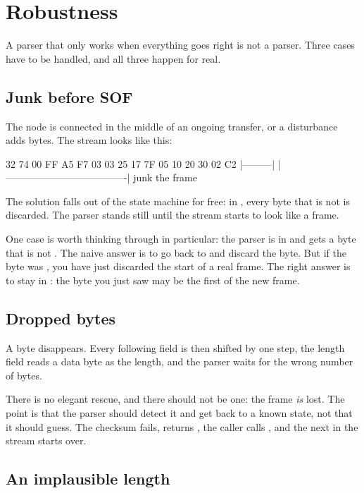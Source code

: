 \section{Robustness}
\label{sec:robust}

A parser that only works when everything goes right is not a parser. Three cases have to be
handled, and all three happen for real.

\subsection{Junk before SOF}

The node is connected in the middle of an ongoing transfer, or a disturbance adds bytes. The
stream looks like this:

\begin{console}
32 74 00 FF A5 F7 03 03 25 17 7F 05 10 20 30 02 C2
|---------| |-------------------------------------|
   junk                    the frame
\end{console}

The solution falls out of the state machine for free: in , every byte that is
not  is discarded. The parser stands still until the stream starts to look like a
frame.

One case is worth thinking through in particular: the parser is in  and gets a
byte that is not . The naive answer is to go back to  and discard the
byte. But if the byte was , you have just discarded the start of a real frame. The
right answer is to stay in : the byte you just saw may be the first of the new
frame.

\subsection{Dropped bytes}

A byte disappears. Every following field is then shifted by one step, the length field reads a
data byte as the length, and the parser waits for the wrong number of bytes.

There is no elegant rescue, and there should not be one: the frame \emph{is} lost. The point is
that the parser should detect it and get back to a known state, not that it should guess. The
checksum fails,  returns , the caller calls , and
the next  in the stream starts over.

\subsection{An implausible length}


